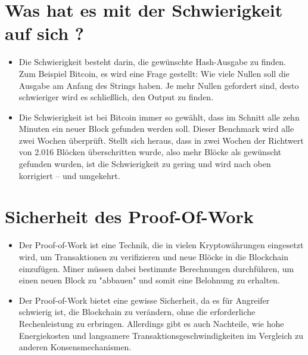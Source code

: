 \documentclass[ngerman]{scrreprt}
\begin{document}
\section{Was hat es mit der Schwierigkeit auf sich ?}
\begin{itemize}
\item{Die Schwierigkeit besteht darin, die gewünschte Hash-Ausgabe zu finden. Zum Beispiel Bitcoin, es wird eine Frage gestellt: Wie viele Nullen soll die Ausgabe am Anfang des Strings haben. Je mehr Nullen gefordert sind, desto schwieriger wird es schließlich, den Output zu finden. \cite{btc-echo-proof-of-work}}
\item{Die Schwierigkeit ist bei Bitcoin immer so gewählt, dass im Schnitt alle zehn Minuten ein neuer Block gefunden werden soll. Dieser Benchmark wird alle zwei Wochen überprüft. Stellt sich heraus, dass in zwei Wochen der Richtwert von 2.016 Blöcken überschritten wurde, also mehr Blöcke als gewünscht gefunden wurden, ist die Schwierigkeit zu gering und wird nach oben korrigiert – und umgekehrt. \cite{btc-echo-proof-of-work}}
\end{itemize}
\section{Sicherheit des Proof-Of-Work}

\begin{itemize}
	\item Der Proof-of-Work ist eine Technik, die in vielen Kryptowährungen eingesetzt wird, um Transaktionen zu verifizieren und neue Blöcke in die Blockchain einzufügen. Miner müssen dabei bestimmte Berechnungen durchführen, um einen neuen Block zu "abbauen" und somit eine Belohnung zu erhalten.
	
	\item Der Proof-of-Work bietet eine gewisse Sicherheit, da es für Angreifer schwierig ist, die Blockchain zu verändern, ohne die erforderliche Rechenleistung zu erbringen. Allerdings gibt es auch Nachteile, wie hohe Energiekosten und langsamere Transaktionsgeschwindigkeiten im Vergleich zu anderen Konsensmechanismen.
\end{itemize}
\end{document}
